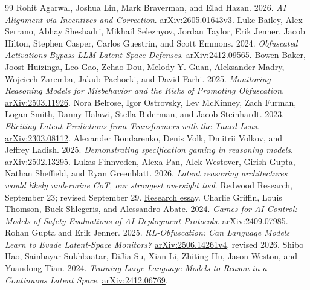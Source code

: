 \begin{thebibliography}{99}
 Rohit Agarwal, Joshua Lin, Mark Braverman, and Elad Hazan. 2026. \emph{AI Alignment via Incentives and Correction}. \href{https://arxiv.org/abs/2605.01643v3}{arXiv:2605.01643v3}.
 Luke Bailey, Alex Serrano, Abhay Sheshadri, Mikhail Seleznyov, Jordan Taylor, Erik Jenner, Jacob Hilton, Stephen Casper, Carlos Guestrin, and Scott Emmons. 2024. \emph{Obfuscated Activations Bypass LLM Latent-Space Defenses}. \href{https://arxiv.org/abs/2412.09565}{arXiv:2412.09565}.
 Bowen Baker, Joost Huizinga, Leo Gao, Zehao Dou, Melody Y. Guan, Aleksander Madry, Wojciech Zaremba, Jakub Pachocki, and David Farhi. 2025. \emph{Monitoring Reasoning Models for Misbehavior and the Risks of Promoting Obfuscation}. \href{https://arxiv.org/abs/2503.11926}{arXiv:2503.11926}.
 Nora Belrose, Igor Ostrovsky, Lev McKinney, Zach Furman, Logan Smith, Danny Halawi, Stella Biderman, and Jacob Steinhardt. 2023. \emph{Eliciting Latent Predictions from Transformers with the Tuned Lens}. \href{https://arxiv.org/abs/2303.08112}{arXiv:2303.08112}.
 Alexander Bondarenko, Denis Volk, Dmitrii Volkov, and Jeffrey Ladish. 2025. \emph{Demonstrating specification gaming in reasoning models}. \href{https://arxiv.org/abs/2502.13295}{arXiv:2502.13295}.
 Lukas Finnveden, Alexa Pan, Alek Westover, Girish Gupta, Nathan Sheffield, and Ryan Greenblatt. 2026. \emph{Latent reasoning architectures would likely undermine CoT, our strongest oversight tool}. Redwood Research, September 23; revised September 29. \href{https://www.redwoodresearch.org/blog/latent-reasoning-architectures-would}{Research essay}.
 Charlie Griffin, Louis Thomson, Buck Shlegeris, and Alessandro Abate. 2024. \emph{Games for AI Control: Models of Safety Evaluations of AI Deployment Protocols}. \href{https://arxiv.org/abs/2409.07985}{arXiv:2409.07985}.
 Rohan Gupta and Erik Jenner. 2025. \emph{RL-Obfuscation: Can Language Models Learn to Evade Latent-Space Monitors?} \href{https://arxiv.org/abs/2506.14261v4}{arXiv:2506.14261v4}, revised 2026.
 Shibo Hao, Sainbayar Sukhbaatar, DiJia Su, Xian Li, Zhiting Hu, Jason Weston, and Yuandong Tian. 2024. \emph{Training Large Language Models to Reason in a Continuous Latent Space}. \href{https://arxiv.org/abs/2412.06769}{arXiv:2412.06769}.

\end{thebibliography}
